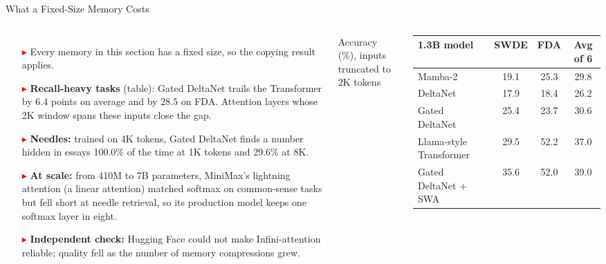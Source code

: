 \begin{frame}{What a Fixed-Size Memory Costs}
  \begin{columns}[T,onlytextwidth]
      \begin{itemize}\footnotesize\itemsep0.3em
        \item[\textcolor{red}{$\blacktriangleright$}] Every memory in this section has a fixed size, so the copying result applies.
        \item[\textcolor{red}{$\blacktriangleright$}] \textbf{Recall-heavy tasks} (table): Gated DeltaNet trails the Transformer by 6.4 points on average and by 28.5 on FDA. Attention layers whose 2K window spans these inputs close the gap.
        \item[\textcolor{red}{$\blacktriangleright$}] \textbf{Needles:} trained on 4K tokens, Gated DeltaNet finds a number hidden in essays 100.0\% of the time at 1K tokens and 29.6\% at 8K.
        \item[\textcolor{red}{$\blacktriangleright$}] \textbf{At scale:} from 410M to 7B parameters, MiniMax's lightning attention (a linear attention) matched softmax on common-sense tasks but fell short at needle retrieval, so its production model keeps one softmax layer in eight.
        \item[\textcolor{red}{$\blacktriangleright$}] \textbf{Independent check:} Hugging Face could not make Infini-attention reliable; quality fell as the number of memory compressions grew.
      \end{itemize}
      \centering
      \vspace{0.2em}
      {\footnotesize Accuracy (\%), inputs truncated to 2K tokens}\\[0.3em]
      {\scriptsize
      \setlength{\tabcolsep}{3pt}
      \begin{tabular}{l c c c}
        \toprule
        \textbf{1.3B model} & \textbf{SWDE} & \textbf{FDA} & \textbf{Avg of 6} \\
        \midrule
        Mamba-2 & 19.1 & 25.3 & 29.8 \\
        DeltaNet & 17.9 & 18.4 & 26.2 \\
        Gated DeltaNet & 25.4 & 23.7 & 30.6 \\
        \addlinespace[0.15em]
        Llama-style Transformer & 29.5 & 52.2 & 37.0 \\
        Gated DeltaNet + SWA & 35.6 & 52.0 & 39.0 \\
        \bottomrule
      \end{tabular}\par}

\end{columns}
\end{frame}
